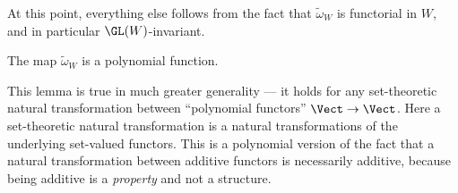 At this point, everything else follows from the fact that $\tilde{\omega}_W$ is functorial in $W$, and in particular $\GL(W)$-invariant.

\begin{lemma}
 The map $\tilde{\omega}_W$ is a polynomial function.
\end{lemma}

This lemma is true in much greater generality --- it holds for any set-theoretic natural transformation between ``polynomial functors'' $\Vect \to \Vect$. Here a set-theoretic natural transformation is a natural transformations of the underlying set-valued functors. This is a polynomial version of the fact that a natural transformation between additive functors is necessarily additive, because being additive is a \emph{property} and not a structure.

